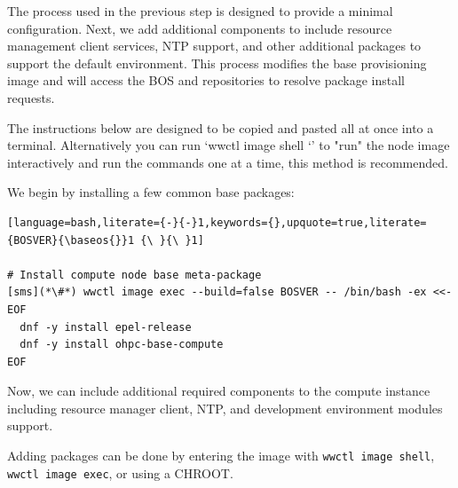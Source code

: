 The process used in the previous step is designed to
provide a minimal \baseOS{} configuration. Next, we add additional components
to include resource management client services, NTP support, and
other additional packages to support the default \OHPC{} environment. This
process modifies the base provisioning image and will access the BOS and \OHPC{}
repositories to resolve package install requests.

The instructions below are designed to be copied and pasted all at once into
a terminal.  Alternatively you can run `wwctl image shell \baseos{}`'
to "run" the node image interactively and run the commands one at a time, this
method is recommended.

We begin by installing a few
common base packages:

\begin{lstlisting}[language=bash,literate={-}{-}1,keywords={},upquote=true,literate={BOSVER}{\baseos{}}1 {\ }{\ }1]

# Install compute node base meta-package
[sms](*\#*) wwctl image exec --build=false BOSVER -- /bin/bash -ex <<- EOF
  dnf -y install epel-release
  dnf -y install ohpc-base-compute
EOF
\end{lstlisting}

\noindent Now, we can include additional required components to the compute
instance including resource manager client, NTP, and development environment modules support.

Adding packages can be done by entering the image with \texttt{wwctl image shell},
\texttt{wwctl image exec}, or using a CHROOT.

